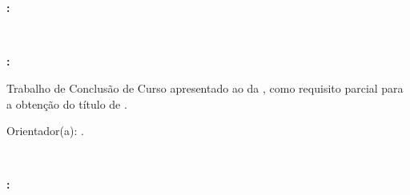 
\begin{titlepage}
\begin{center}
\singlespacing
\textbf{\MakeUppercase{\instituicao}}\\
\textbf{\MakeUppercase{\unidade}}\\
\textbf{\MakeUppercase{\curso}}

\vspace*{3.2cm}
\textbf{\MakeUppercase{\autor}}

\vfill
\textbf{\titulo:} \subtitulo

\vfill
\local\\
\ano
\end{center}
\end{titlepage}

\setcounter{page}{1}
\begin{center}
\singlespacing
\textbf{\MakeUppercase{\autor}}

\vspace*{5cm}
\textbf{\titulo:} \subtitulo
\end{center}

\vspace{2.5cm}
\noindent\hspace{0.45\textwidth}\begin{minipage}{0.55\textwidth}
\singlespacing\small
Trabalho de Conclusão de Curso apresentado ao \curso{} da \instituicao, como requisito parcial
para a obtenção do título de \grau.

\vspace{12pt}
Orientador(a): \orientacao.
\end{minipage}

\vfill
\begin{center}
\local\\
\ano
\end{center}

\clearpage
\begin{center}
\singlespacing
\textbf{\MakeUppercase{\autor}}

\vspace{1.5cm}
\textbf{\titulo:} \subtitulo
\end{center}

